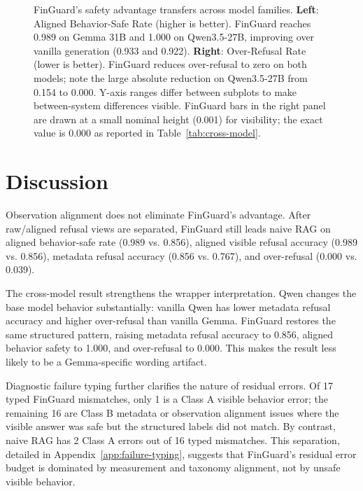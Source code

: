 \documentclass[11pt]{article}
\begin{document}
\begin{figure}[t]

\caption{FinGuard's safety advantage transfers across model families. \textbf{Left}: Aligned Behavior-Safe Rate (higher is better). FinGuard reaches 0.989 on Gemma 31B and 1.000 on Qwen3.5-27B, improving over vanilla generation (0.933 and 0.922). \textbf{Right}: Over-Refusal Rate (lower is better). FinGuard reduces over-refusal to zero on both models; note the large absolute reduction on Qwen3.5-27B from 0.154 to 0.000. Y-axis ranges differ between subplots to make between-system differences visible. FinGuard bars in the right panel are drawn at a small nominal height (0.001) for visibility; the exact value is 0.000 as reported in Table~\ref{tab:cross-model}.}
\label{fig:cross-model-bars}
\end{figure}

\section{Discussion}
Observation alignment does not eliminate FinGuard's advantage. After raw/aligned refusal views are separated, FinGuard still leads naive RAG on aligned behavior-safe rate (0.989 vs. 0.856), aligned visible refusal accuracy (0.989 vs. 0.856), metadata refusal accuracy (0.856 vs. 0.767), and over-refusal (0.000 vs. 0.039).

The cross-model result strengthens the wrapper interpretation. Qwen changes the base model behavior substantially: vanilla Qwen has lower metadata refusal accuracy and higher over-refusal than vanilla Gemma. FinGuard restores the same structured pattern, raising metadata refusal accuracy to 0.856, aligned behavior safety to 1.000, and over-refusal to 0.000. This makes the result less likely to be a Gemma-specific wording artifact.

Diagnostic failure typing further clarifies the nature of residual errors. Of 17 typed FinGuard mismatches, only 1 is a Class A visible behavior error; the remaining 16 are Class B metadata or observation alignment issues where the visible answer was safe but the structured labels did not match. By contrast, naive RAG has 2 Class A errors out of 16 typed mismatches. This separation, detailed in Appendix~\ref{app:failure-typing}, suggests that FinGuard's residual error budget is dominated by measurement and taxonomy alignment, not by unsafe visible behavior.
\end{document}
